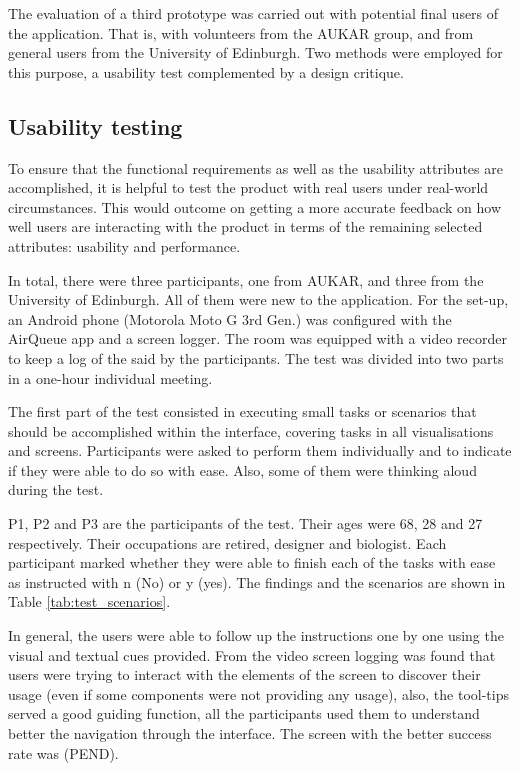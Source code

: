 The evaluation of a third prototype was carried out with potential final users of the application. That is, with volunteers from the AUKAR group, and from general users from the University of Edinburgh. Two methods were employed for this purpose, a usability test complemented by a design critique. 

\subsection{Usability testing}
To ensure that the functional requirements as well as the usability attributes are accomplished, it is helpful to test the product with real users under real-world circumstances. This would outcome on getting a more accurate feedback on how well users are interacting with the product in terms of the remaining selected attributes: usability and performance.

In total, there were three participants, one from AUKAR, and three from the University of Edinburgh. All of them were new to the application. For the set-up, an Android phone (Motorola Moto G 3rd Gen.) was configured with the AirQueue app and a screen logger. The room was equipped with a video recorder to keep a log of the said by the participants. The test was divided into two parts in a one-hour individual meeting. 

The first part of the test consisted in executing small tasks or scenarios that should be accomplished within the interface, covering tasks in all visualisations and screens. Participants were asked to perform them individually and to indicate if they were able to do so with ease. Also, some of them were thinking aloud during the test. 

P1, P2 and P3 are the participants of the test. Their ages were 68, 28 and 27 respectively. Their occupations are retired, designer and biologist. Each participant marked whether they were able to finish each of the tasks with ease as instructed with n (No) or y (yes). The findings and the scenarios are shown in Table \ref{tab:test_scenarios}.

In general, the users were able to follow up the instructions one by one using the visual and textual cues provided. From the video screen logging was found that users were trying to interact with the elements of the screen to discover their usage (even if some components were not providing any usage), also, the tool-tips served a good guiding function, all the participants used them to understand better the navigation through the interface. The screen with the better success rate was (PEND). 

